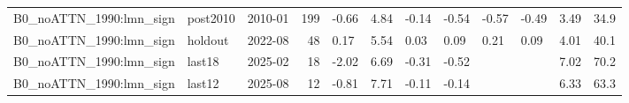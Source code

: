 \begin{table}
\begin{tabular}{lllrllllllll}
B0\_noATTN\_1990:lmn\_sign & post2010 & 2010-01 & 199 & -0.66 & 4.84 & -0.14 & -0.54 & -0.57 & -0.49 & 3.49 & 34.9 \\
B0\_noATTN\_1990:lmn\_sign & holdout & 2022-08 & 48 & 0.17 & 5.54 & 0.03 & 0.09 & 0.21 & 0.09 & 4.01 & 40.1 \\
B0\_noATTN\_1990:lmn\_sign & last18 & 2025-02 & 18 & -2.02 & 6.69 & -0.31 & -0.52 &  &  & 7.02 & 70.2 \\
B0\_noATTN\_1990:lmn\_sign & last12 & 2025-08 & 12 & -0.81 & 7.71 & -0.11 & -0.14 &  &  & 6.33 & 63.3 \\
\bottomrule
\end{tabular}
\end{table}

